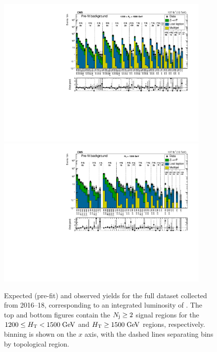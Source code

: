 \begin{figure}[htbp]
  \begin{center}
    \includegraphics[width=0.93\textwidth]{figs/results/prefit_HT1200to1500_ratio.pdf} \\
    \includegraphics[width=0.93\textwidth]{figs/results/prefit_HT1500toInf_ratio.pdf} \\
    \caption{Expected (pre-fit) and observed yields for the full dataset collected from
      2016--18, corresponding to an integrated luminosity of \Lint. The top and bottom figures
      contain the $N_{\mathrm{j}}\geq2$ signal regions for the $1200 \leq H_{\mathrm{T}} < 1500\;\text{Ge\hspace{-.08em}V}$ and $H_{\mathrm{T}}\geq1500\;\text{Ge\hspace{-.08em}V}$
      regions, respectively. \mttwo binning is shown on the $x$ axis, with the dashed lines separating
      bins by topological region.
            }
    \label{fig:results_h_uh}
  \end{center}
\end{figure}

